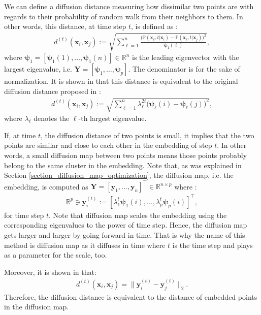 \documentclass[lang=cn,10pt]{gorgeousnbook}
\numberwithin{equation}{section}%
\numberwithin{figure}{section}%
\begin{document}
We can define a diffusion distance measuring how dissimilar two points are with regards to their probability of random walk from their neighbors to them. In other words, this distance, at time step $t$, is defined as \cite{nadler2006diffusion,nadler2006diffusion2}:
\begin{align}
d^{(t)}(\boldsymbol{x}_i, \boldsymbol{x}_j) := \sqrt{\sum_{\ell=1}^n \frac{\big(\mathbb{P}(\boldsymbol{x}_\ell, t | \boldsymbol{x}_i) - \mathbb{P}(\boldsymbol{x}_\ell, t | \boldsymbol{x}_j)\big)^2}{\boldsymbol{\psi}_1(\ell)}},
\end{align}
where $\boldsymbol{\psi}_1 = [\boldsymbol{\psi}_1(1), \dots, \boldsymbol{\psi}_1(n)] \in \mathbb{R}^n$ is the leading eigenvector with the largest eigenvalue, i.e. $\boldsymbol{Y} = [\boldsymbol{\psi}_1, \dots, \boldsymbol{\psi}_p]$.
The denominator is for the sake of normalization.
It is shown in \cite{nadler2006diffusion2} that this distance is equivalent to the original diffusion distance proposed in \cite{coifman2006diffusion}:
\begin{align}
d^{(t)}(\boldsymbol{x}_i, \boldsymbol{x}_j) := \sqrt{\sum_{\ell=1}^n \lambda_\ell^{2t} \big(\boldsymbol{\psi}_\ell(i) - \boldsymbol{\psi}_\ell(j)\big)^2},
\end{align}
where $\lambda_\ell$ denotes the $\ell$-th largest eigenvalue. 

If, at time $t$, the diffusion distance of two points is small, it implies that the two points are similar and close to each other in the embedding of step $t$. 
In other words, a small diffusion map between two points means those points probably belong to the same cluster in the embedding. 
Note that, as was explained in Section \ref{section_diffusion_map_optimization}, the diffusion map, i.e. the embedding, is computed as $\boldsymbol{Y} = [\boldsymbol{y}_1, \dots, \boldsymbol{y}_n]^\top \in \mathbb{R}^{n \times p}$ where \cite{coifman2006diffusion}:
\begin{align}
\mathbb{R}^p \ni \boldsymbol{y}_i^{(t)} := [\lambda_1^t \boldsymbol{\psi}_1(i), \dots, \lambda_p^t \boldsymbol{\psi}_p(i)]^\top,
\end{align}
for time step $t$.
Note that diffusion map scales the embedding using the corresponding eigenvalues to the power of time step. Hence, the diffusion map gets larger and larger by going forward in time. That is why the name of this method is diffusion map as it diffuses in time where $t$ is the time step and plays as a parameter for the scale, too. 

Moreover, it is shown in \cite{nadler2006diffusion2} that:
\begin{align}
d^{(t)}(\boldsymbol{x}_i, \boldsymbol{x}_j) = \big\|\boldsymbol{y}_i^{(t)} - \boldsymbol{y}_j^{(t)}\big\|_2.
\end{align}
Therefore, the diffusion distance is equivalent to the distance of embedded points in the diffusion map.
\end{document}
